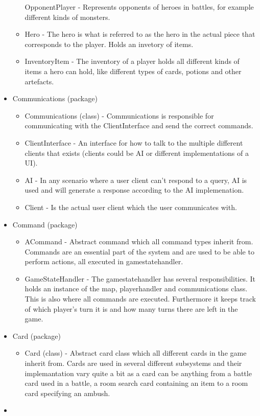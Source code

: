 \begin{itemize}
\begin{itemize}
	OpponentPlayer - Represents opponents of heroes in battles, for example different kinds of monsters.
	\item
	Hero - The hero is what is referred to as the hero in the actual piece that corresponds to the player. Holds an invetory of items.
	\item
	InventoryItem - The inventory of a player holds all different kinds of items a hero can hold, like different types of cards, potions and other artefacts.
	\end{itemize}
\item
Communications (package)
	\begin{itemize}
	\item
	Communications (class) - Communications is responsible for communicating with the ClientInterface and send the correct commands.  
	\item
	ClientInterface - An interface for how to talk to the multiple different clients that exists (clients could be AI or different implementations of a UI).
	\item
	AI - In any scenario where a user client can't respond to a query, AI is used and will generate a response according to the AI implemenation.
	\item
	Client - Is the actual user client which the user communicates with.
	\end{itemize}
\item
Command (package)
	\begin{itemize}
	\item
	ACommand - Abstract command which all command types inherit from. Commands are an essential part of the system and are used to be able to perform actions, all executed in gamestatehandler.   
	\item
	GameStateHandler - The gamestatehandler has several responsibilities. It holds an instance of the map, playerhandler and communications class. This is also where all commands are executed. Furthermore it keeps track of which player's turn it is and how many turns there are left in the game. 
	\end{itemize}
\item
Card (package)
	\begin{itemize}
	\item
	Card (class) - Abstract card class which all different cards in the game inherit from. Cards are used in several different subsystems and their implemantation vary quite a bit as a card can be anything from a battle card used in a battle, a room search card containing an item to a room card specifying an ambush.   
	\end{itemize}
\item
\end{itemize}
